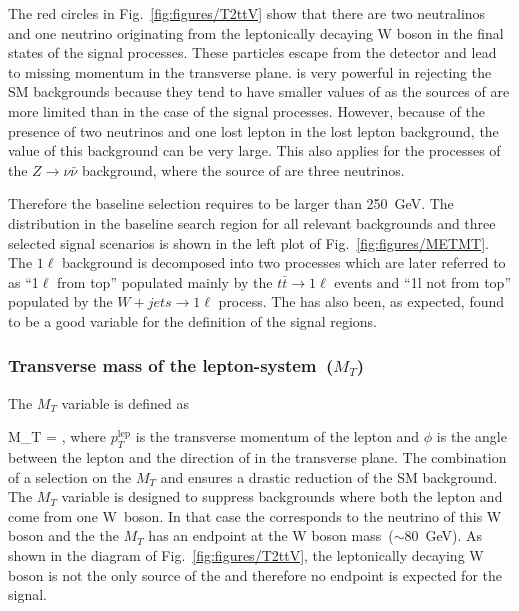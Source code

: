 The red circles in Fig.~\ref{fig:figures/T2ttV} show that there are two neutralinos and one neutrino originating from the leptonically decaying W boson  in the final states of the signal processes. These particles escape from the detector and lead to missing momentum in the transverse plane. \MET is very powerful in rejecting the SM backgrounds because they tend to have smaller values of \MET as the sources of \MET are more limited than in  the case of the signal processes. However, because of the presence of two neutrinos and one lost lepton in the lost lepton background, the \MET value of this background can be very large. This also applies for the processes of the $Z \to \nu \bar{\nu}$ background, where the source of \MET are three neutrinos.

Therefore the baseline selection requires \MET to be larger than 250~GeV. The \MET distribution in the baseline search region for all relevant backgrounds and three selected signal scenarios is shown in the left plot of Fig.~\ref{fig:figures/METMT}. The $1\ell$ background is decomposed into two processes which are later referred to as ``1$\ell$ from top'' populated mainly by the $t \bar{t} \to 1\ell$ events and ``1l not from top'' populated by the $W+jets \to 1\ell$  process. The \MET has also been, as expected, found to be a good variable for the definition of the signal regions.


\subsubsection{Transverse mass of the lepton-\MET system~($M_{T}$)}

The $M_{T}$ variable is defined as

{
 M_{T} =  ,
}
where $p_{T}^{\mathrm{lep}}$ is the transverse momentum of the lepton and $\phi$ is the angle between the lepton and the direction of \MET in the transverse plane. The combination of a selection on the $M_{T}$ and \MET ensures a drastic reduction of the SM background. The $M_{T}$ variable is  designed to suppress backgrounds where both the lepton and \MET come from one W~boson. In that case the \MET corresponds to the neutrino of this W boson and the the $M_{T}$ has an endpoint at the W boson mass~($\sim$80~GeV). As shown in the diagram of Fig.~\ref{fig:figures/T2ttV}, the leptonically decaying W boson is not the only source of the \MET and therefore no endpoint is expected for the signal.



